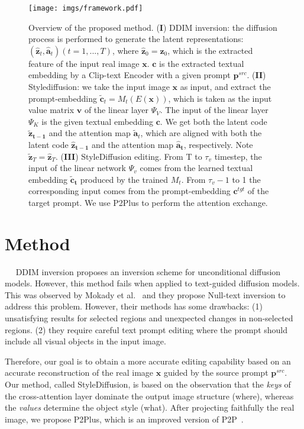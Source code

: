 \documentclass[twocolumn]{svjour3}          \smartqed  \usepackage{graphicx}
\newcommand{\minisection}[1]{\vspace{0.04in} \noindent {\bf #1}\ \ }
\begin{document}
 
\begin{figure*}[t]
\centering
\texttt{[image: imgs/framework.pdf]}
        \caption{Overview of the proposed method. (\textbf{I}) DDIM inversion: the diffusion process is performed to generate the latent representations: ${(\mathbf{\hat{z}}_t, \mathbf{\hat{a}}_t)} (t = 1,...,T)$, where $\mathbf{\hat{z}}_0 = \mathbf{z}_0$, which is the extracted feature of the input real image $\mathbf{x}$. $\mathbf{c}$ is the extracted textual embedding by a Clip-text Encoder with a given prompt $\mathbf{p}^{src}$.    (\textbf{II}) Stylediffusion: we take the input image $\mathbf{x}$ as input, and extract the prompt-embedding $\mathbf{\widetilde{c}}_{t} = M_{t}\left ( E(\mathbf{\mathbf{x}})\right )$, which is taken as the input value matrix $\mathbf{v}$ of the linear layer $\Psi_V$. The input of  the linear layer $\Psi_K$ is the given textual embedding $\mathbf{c}$.  We get both the latent code $\mathbf{\widetilde{z}_{t-1}}$ and the attention map $\mathbf{\widetilde{a}}_t$, which are aligned with both the latent code $\mathbf{\hat{z}_{t-1}}$ and the attention map $\mathbf{\hat{a}_{t}}$, respectively.  Note  $\mathbf{\widetilde{z}}_T = \mathbf{\hat{z}}_T$.     (\textbf{III}) StyleDiffusion editing. From T to $\tau_v$ timestep, the input of the linear network $\Psi_v$ comes from the learned textual embedding $\mathbf{\widetilde {c}_{t}}$ produced by the trained $M_t$. From $\tau_{v}-1$ to 1 the corresponding input comes from the prompt-embedding $\mathbf{c}^{tgt}$ of the target prompt. We use P2Plus to perform the attention exchange.}
    \label{fig:framework}
\end{figure*}




\section{Method}

\minisection{Problem setting.} 
DDIM inversion proposes an inversion scheme for unconditional diffusion models. However, this method fails when applied to text-guided diffusion models. This was observed by Mokady et al.~\citep{mokady2022null} and they propose Null-text inversion to address this problem. However, their methods has some drawbacks:  (1) unsatisfying results for selected regions and unexpected changes in non-selected regions. (2) they require careful text prompt editing where the prompt should include all visual objects in the input image.

Therefore, our goal is to obtain a more accurate editing capability based on an accurate reconstruction of the real image $\mathbf{x}$ guided by the source prompt $\mathbf{p}^{src}$.      
Our method, called StyleDiffusion, is based on  the observation that the \emph{keys} of the cross-attention layer dominate the output image structure (where),  whereas the \emph{values} determine the object style (what). After projecting faithfully the real image, we propose P2Plus, which is an improved version of P2P~\citep{hertz2022prompt}. 
\end{document}
